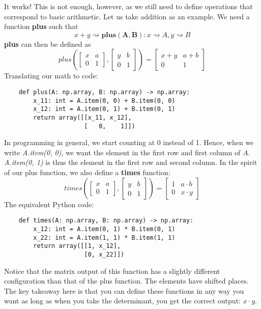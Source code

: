 It works! This is not enough, however, as we still need to define operations
that correspond to basic arithmetic. Let us take addition as an
example. We need a function \textbf{plus} such that
\begin{equation*}
    x + y \rightsquigarrow \mathbf{plus(A, B)} : x \rightsquigarrow A, y
    \rightsquigarrow B
\end{equation*}
\textbf{plus} can then be defined as
\begin{equation*}
    plus\left(
    \begin{bmatrix}
        x & a \\
        0 & 1
    \end{bmatrix},
    \begin{bmatrix}
        y & b \\
        0 & 1
    \end{bmatrix}
    \right)
    =
    \begin{bmatrix}
        x + y & a + b \\
        0     & 1
    \end{bmatrix}
\end{equation*}
Translating our math to code:
\begin{verbatim}
    def plus(A: np.array, B: np.array) -> np.array:
        x_11: int = A.item(0, 0) + B.item(0, 0)
        x_12: int = A.item(0, 1) + B.item(0, 1)
        return array([[x_11, x_12],
                      [   0,    1]])
\end{verbatim}
In programming in general, we start counting at 0 instead of 1. Hence, when we
write \textit{A.item(0, 0)}, we want the element in the first row and first
column
of
$ A $. \textit{A.item(0, 1)} is thus the element in the first row and second
column. In the spirit of our plus function, we also define a \textbf{times}
function:
\begin{equation*}
   times\left(
   \begin{bmatrix}
       x & a \\
       0 & 1
   \end{bmatrix},
   \begin{bmatrix}
       y & b \\
       0 & 1
   \end{bmatrix}
   \right)
   =
   \begin{bmatrix}
       1 & a  \cdot b \\
       0     & x \cdot y
   \end{bmatrix}
\end{equation*}
The equivalent Python code:
\begin{verbatim}
    def times(A: np.array, B: np.array) -> np.array:
        x_12: int = A.item(0, 1) * B.item(0, 1)
        x_22: int = A.item(1, 1) * B.item(1, 1)
        return array([[1, x_12],
                      [0, x_22]])
\end{verbatim}
Notice that the matrix output of this function has a slightly different
configuration than that of the plus function. The elements have shifted places.
The key takeaway here is that you can define these functions in any way you
want as long as when you take the determinant, you get the correct output:
$ x \cdot y $.

